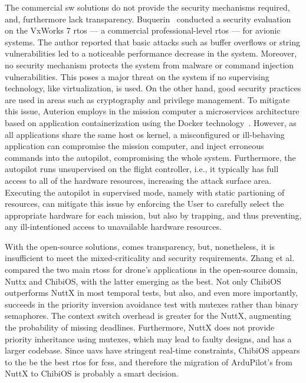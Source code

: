 The commercial \gls{sw} solutions do not provide the security mechanisms
required, and, furthermore lack transparency. 
%
Buquerin~\cite{buquerin2018security} conducted a security evaluation on the
VxWorks 7 \gls{rtos} --- a commercial professional-level \gls{rtos} --- for
avionic systems. The author reported that basic attacks such as
buffer overflows or string vulnerabilities led to a noticeable performance
decrease in the system. Moreover, no security mechanism protects the system
from malware or command injection vulnerabilities. This poses a major threat on
the system if no supervising technology, like virtualization, is used. On the other hand, good security practices are used in
areas such as cryptography and privilege management.
To mitigate this issue, Auterion employs in the mission computer a microservices architecture based on
application containerization using the Docker
technology~\cite{auterion-sw-services}. However, as all applications share the
same host \gls{os} kernel, a misconfigured or ill-behaving application can
compromise the mission computer, and inject erroneous commands into the
autopilot, compromising the whole system. Furthermore, the autopilot runs
unsupervised on the flight controller, i.e., it typically has full access to all
of the hardware resources, increasing the attack surface area. Executing the
autopilot in supervised mode, namely with static partioning of resources, can
mitigate this issue by enforcing the User to carefully select the appropriate
hardware for each mission, but also by trapping, and thus preventing, any ill-intentioned access to unavailable hardware resources.

With the open-source solutions, comes transparency, but, nonetheless, it is
insufficient to meet the mixed-criticality and security requirements.
Zhang et al.~\cite{zhang2021best} compared the two main \glspl{rtos} for drone's applications in the
open-source domain, Nuttx and ChibiOS, with the latter emerging as the best. Not
only ChibiOS outperforms NuttX in most temporal tests, but also, and even more
importantly, succeeds in the priority inversion avoidance test with mutexes
rather than binary semaphores. The context switch overhead is greater for
the NuttX, augmenting the probability of missing deadlines. Furthermore, NuttX
does not provide priority inheritance using mutexes, which may lead to faulty
designs, and has a larger codebase. Since \glspl{uav} have stringent real-time
constraints, ChibiOS appears to the be the best \gls{rtos} for \glspl{fcs}, and
therefore the migration of ArduPilot's from NuttX to ChibiOS is probably a smart
decision.

